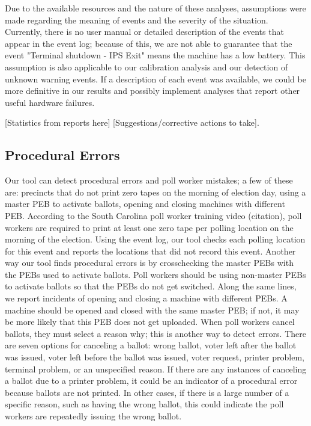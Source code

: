 Due to the available resources and the nature of these analyses, assumptions were made regarding the meaning of events and the severity of the situation.  Currently, there is no user manual or detailed description of the events that appear in the event log; because of this, we are not able to guarantee that the event "Terminal shutdown - IPS Exit" means the machine has a low battery.  This assumption is also applicable to our calibration analysis and our detection of unknown warning events.  If a description of each event was available, we could be more definitive in our results and possibly implement analyses that report other useful hardware failures.    

[Statistics from reports here] [Suggestions/corrective actions to take].  
 

\subsection{Procedural Errors}
Our tool can detect procedural errors and poll worker mistakes; a few of these are: precincts that do not print zero tapes on the morning of election day, using a master PEB to activate ballots, opening and closing machines with different PEB.  According to the South Carolina poll worker training video (citation), poll workers are required to print at least one zero tape per polling location on the morning of the election.  Using the event log, our tool checks each polling location for this event and reports the locations that did not record this event.  Another way our tool finds procedural errors is by crosschecking the master PEBs with the PEBs used to activate ballots.  Poll workers should be using non-master PEBs to activate ballots so that the PEBs do not get switched.  Along the same lines, we report incidents of opening and closing a machine with different PEBs.  A machine should be opened and closed with the same master PEB; if not, it may be more likely that this PEB does not get uploaded.   When poll workers cancel ballots, they must select a reason why; this is another way to detect errors.  There are seven options for canceling a ballot: wrong ballot, voter left after the ballot was issued, voter left before the ballot was issued, voter request, printer problem, terminal problem, or an unspecified reason.  If there are any instances of canceling a ballot due to a printer problem, it could be an indicator of a procedural error because ballots are not printed.  In other cases, if there is a large number of a specific reason, such as having the wrong ballot, this could indicate the poll workers are repeatedly issuing the wrong ballot.  


